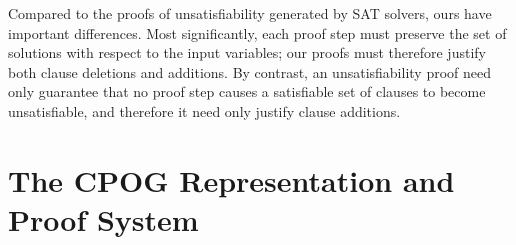 \documentclass[twoside,11pt]{article}
\newcommand{\nil}{\bot}
\newcommand{\obar}[1]{\overline{#1}}
\begin{document}
Compared to the proofs of unsatisfiability generated by SAT solvers,
ours have important differences.  Most
significantly, each proof step must preserve the set of solutions with respect to the input variables;
our proofs must therefore justify both clause deletions and additions.
By contrast, an unsatisfiability proof need only guarantee that
no proof step causes a satisfiable set of clauses to become
unsatisfiable, and therefore it need only justify clause additions.


\section{The CPOG Representation and Proof System}
\label{sect:cpog}


\end{document}
